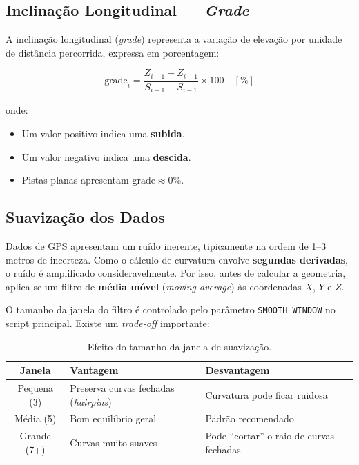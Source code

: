 \documentclass[a4paper,12pt]{article}
\begin{document}
\subsection{Inclinação Longitudinal --- \textit{Grade}}

A inclinação longitudinal (\textit{grade}) representa a variação de elevação por unidade de distância percorrida, expressa em porcentagem:

\begin{equation}
    \text{grade}_i = \frac{Z_{i+1} - Z_{i-1}}{S_{i+1} - S_{i-1}} \times 100 \quad [\%]
    \label{eq:grade}
\end{equation}

\noindent onde:
\begin{itemize}
    \item Um valor positivo indica uma \textbf{subida}.
    \item Um valor negativo indica uma \textbf{descida}.
    \item Pistas planas apresentam $\text{grade} \approx 0\%$.
\end{itemize}

\subsection{Suavização dos Dados}

Dados de GPS apresentam um ruído inerente, tipicamente na ordem de 1--3 metros de incerteza. Como o cálculo de curvatura envolve \textbf{segundas derivadas}, o ruído é amplificado consideravelmente. Por isso, antes de calcular a geometria, aplica-se um filtro de \textbf{média móvel} (\textit{moving average}) às coordenadas $X$, $Y$ e $Z$.

O tamanho da janela do filtro é controlado pelo parâmetro \texttt{SMOOTH\_WINDOW} no script principal. Existe um \textit{trade-off} importante:

\begin{table}[H]
\centering
\caption{Efeito do tamanho da janela de suavização.}
\label{tab:smooth}
\begin{tabular}{cll}
\toprule
\textbf{Janela} & \textbf{Vantagem} & \textbf{Desvantagem} \\
\midrule
Pequena (3) & Preserva curvas fechadas (\textit{hairpins}) & Curvatura pode ficar ruidosa \\
Média (5)   & Bom equilíbrio geral & Padrão recomendado \\
Grande (7+) & Curvas muito suaves & Pode ``cortar'' o raio de curvas fechadas \\
\bottomrule
\end{tabular}
\end{table}
\end{document}
